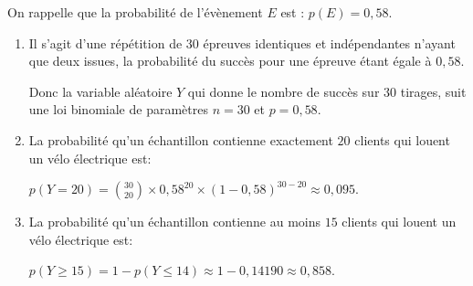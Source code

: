 \documentclass[10pt]{article}
\providecommand{\ds}{\displaystyle}
\begin{document}
\begin{enumerate}
On rappelle que la probabilité de l'évènement $E$ est : $p(E) = 0,58$.
	\begin{enumerate}
		\item 
Il s'agit d'une répétition de 30 épreuves identiques et indépendantes n'ayant que deux issues, la probabilité du succès pour une épreuve étant égale à $0,58$.		
		
		Donc la variable aléatoire $Y$ qui donne le nombre de succès sur 30 tirages, suit une loi binomiale de paramètres $n=30$ et $p=0,58$.
				
		\item La probabilité qu'un échantillon contienne exactement $20$ clients qui louent un vélo électrique est:
		
$p(Y=20) = \ds\binom{30}{20}\times 0,58^{20}	\times (1-0,58)^{30-20}
\approx 0,095$.

		\item La probabilité qu'un échantillon contienne au moins $15$ clients qui louent un vélo électrique est:

$p(Y\geqslant 15) = 1 - p(Y\leqslant 14)\approx 1 - 0,14190 \approx 0,858$.

	\end{enumerate}

\end{enumerate}
\end{document}
